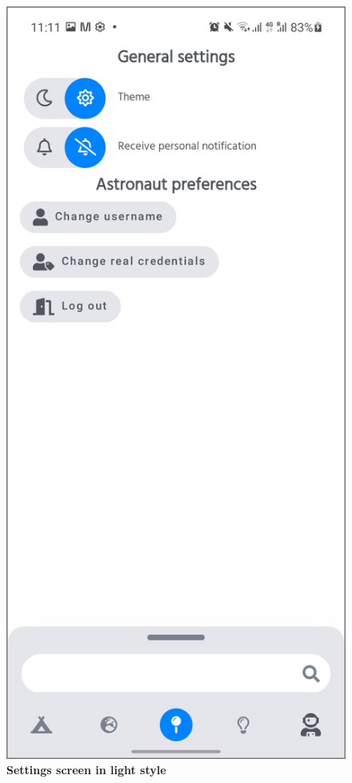 \begin{figure}[!htb]
\begin{minipage}{.48\textwidth}
\includegraphics[width=.9\textwidth]{../Images/UI/SettingsLight.jpg}
\caption{\label{fig:dbapiuser}\textbf{Settings screen in light style}}
\end{minipage} 
\begin{minipage}{.48\textwidth}

\end{minipage}
\end{figure}

